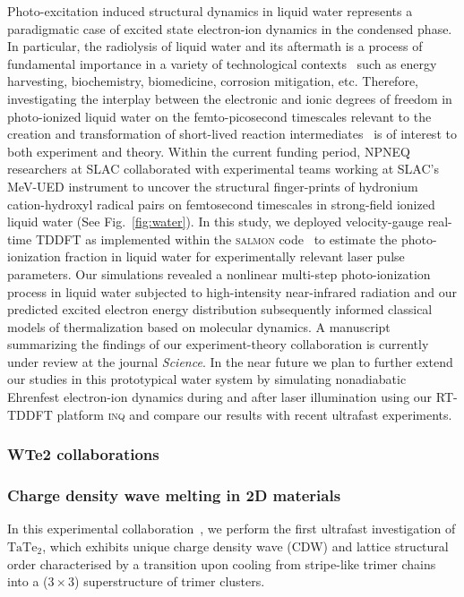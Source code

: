 Photo-excitation induced structural dynamics in liquid water represents a paradigmatic case of excited state electron-ion dynamics in the condensed phase. 
In particular, the radiolysis of liquid water and its aftermath is a process of fundamental importance in a variety of technological contexts~\cite{Garrett2005} such as energy harvesting, biochemistry, biomedicine, corrosion mitigation, etc. 
Therefore, investigating the interplay between the electronic and ionic degrees of freedom in photo-ionized liquid water on the femto-picosecond timescales relevant to the creation and transformation of short-lived reaction intermediates~\cite{Loh2020} is of interest to both experiment and theory.
Within the current funding period, NPNEQ researchers at SLAC collaborated with experimental teams working at SLAC's MeV-UED instrument to uncover the structural finger-prints of hydronium cation-hydroxyl radical pairs on femtosecond timescales in strong-field ionized liquid water (See Fig.~\ref{fig:water}). 
In this study, we deployed velocity-gauge real-time TDDFT as implemented within the \textsc{salmon} code~\cite{salmon} to estimate the photo-ionization fraction in liquid water for experimentally relevant laser pulse parameters. 
Our simulations revealed a nonlinear multi-step photo-ionization process in liquid water subjected to high-intensity near-infrared radiation and our predicted excited electron energy distribution subsequently informed classical models of thermalization based on molecular dynamics. 
A manuscript summarizing the findings of our experiment-theory collaboration is currently under review at the journal \emph{Science}.
In the near future we plan to further extend our studies in this prototypical water system by simulating nonadiabatic Ehrenfest electron-ion dynamics during and after laser illumination using our RT-TDDFT platform \textsc{inq} and compare our results with recent ultrafast experiments. 

\subsubsection{WTe2 collaborations}

\subsubsection{Charge density wave melting in 2D materials}

In this experimental collaboration~\cite{Siddiqui2020}, we perform the first ultrafast investigation of \(\mathrm{TaTe_2}\), which exhibits unique charge density wave (CDW) and lattice structural order characterised by a transition upon cooling from stripe-like trimer chains into a (\(3\times 3\)) superstructure of trimer clusters. 


